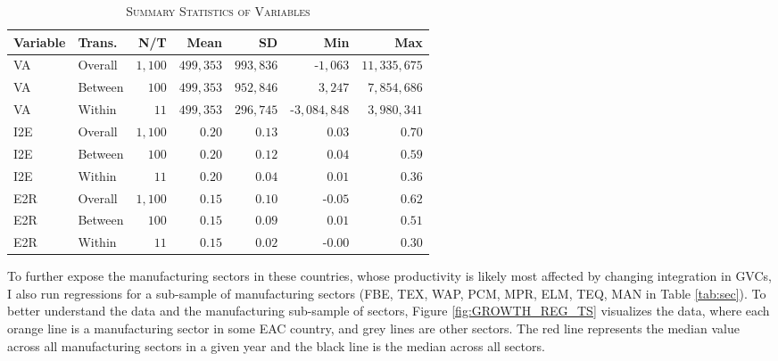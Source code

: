 \documentclass[a4paper]{article}
\begin{document}
\begin{table}[h!] \centering 
  \caption{\label{tab:SUMM_GROWTH}\textsc{Summary Statistics of Variables}}
  \begin{center}
\begin{tabular}{ llrrrrr} \toprule
Variable & Trans. & N/T & Mean & SD & Min & Max \\ \midrule
VA & Overall & $1,100$ & $499,353$ & $993,836$ & -$1,063$ & $11,335,675$ \\ 
VA & Between & $100$ & $499,353$ & $952,846$ & $3,247$ & $7,854,686$ \\ 
VA & Within & $11$ & $499,353$ & $296,745$ & -$3,084,848$ & $3,980,341$ \\ 
I2E & Overall & $1,100$ & $0.20$ & $0.13$ & $0.03$ & $0.70$ \\ 
I2E & Between & $100$ & $0.20$ & $0.12$ & $0.04$ & $0.59$ \\ 
I2E & Within & $11$ & $0.20$ & $0.04$ & $0.01$ & $0.36$ \\ 
E2R & Overall & $1,100$ & $0.15$ & $0.10$ & -$0.05$ & $0.62$ \\ 
E2R & Between & $100$ & $0.15$ & $0.09$ & $0.01$ & $0.51$ \\ 
E2R & Within & $11$ & $0.15$ & $0.02$ & -$0.00$ & $0.30$ \\ \bottomrule
\end{tabular} 
 \end{center}
\end{table} 
\FloatBarrier 

To further expose the manufacturing sectors in these countries, whose productivity is likely most affected by changing integration in GVCs, I also run regressions for a sub-sample of manufacturing sectors (FBE, TEX, WAP, PCM, MPR, ELM, TEQ, MAN in Table \ref{tab:sec}). To better understand the data and the manufacturing sub-sample of sectors, Figure \ref{fig:GROWTH_REG_TS} visualizes the data, where each orange line is a manufacturing sector in some EAC country, and grey lines are other sectors. The red line represents the median value across all manufacturing sectors in a given year and the black line is the median across all sectors.  
\end{document}
